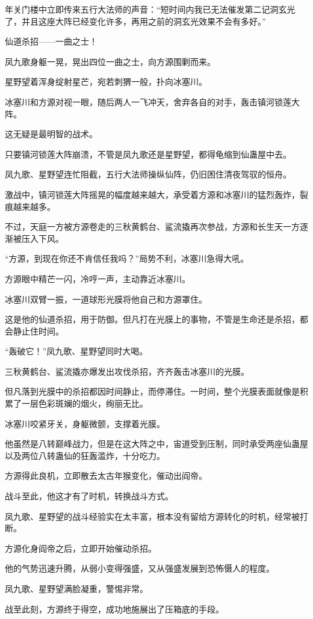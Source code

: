 \begin{this_body}
年关门楼中立即传来五行大法师的声音：“短时间内我已无法催发第二记洞玄光了，并且这座大阵已经变化许多，再用之前的洞玄光效果不会有多好。”

仙道杀招——一曲之士！

凤九歌身躯一晃，晃出四位一曲之士，向方源围剿而来。

星野望着浑身绽射星芒，宛若刺猬一般，扑向冰塞川。

冰塞川和方源对视一眼，随后两人一飞冲天，舍弃各自的对手，轰击镇河锁莲大阵。

这无疑是最明智的战术。

只要镇河锁莲大阵崩溃，不管是凤九歌还是星野望，都得龟缩到仙蛊屋中去。

凤九歌、星野望连忙阻截，五行大法师操纵仙阵，仍旧困住清夜驾驭的恒舟。

激战中，镇河锁莲大阵摇晃的幅度越来越大，承受着方源和冰塞川的猛烈轰炸，裂痕越来越多。

不过，天庭一方被方源卷走的三秋黄鹤台、鲨流撬再次参战，方源和长生天一方逐渐被压入下风。

“方源，到现在你还不肯信任我吗？”局势不利，冰塞川急得大吼。

方源眼中精芒一闪，冷哼一声，主动靠近冰塞川。

冰塞川双臂一振，一道球形光膜将他自己和方源罩住。

这是他的仙道杀招，用于防御。但凡打在光膜上的事物，不管是生命还是杀招，都会静止住时间。

“轰破它！”凤九歌、星野望同时大喝。

三秋黄鹤台、鲨流撬亦爆发出攻伐杀招，齐齐轰击冰塞川的光膜。

但凡落到光膜中的杀招都因时间静止，而停滞住。一时间，整个光膜表面就像是积累了一层色彩斑斓的烟火，绚丽无比。

冰塞川咬紧牙关，身躯微颤，支撑着光膜。

他虽然是八转巅峰战力，但是在这大阵之中，宙道受到压制，同时承受两座仙蛊屋以及两位八转蛊仙的狂轰滥炸，十分吃力。

方源得此良机，立即散去太古年猴变化，催动出阎帝。

战斗至此，他这才有了时机，转换战斗方式。

凤九歌、星野望的战斗经验实在太丰富，根本没有留给方源转化的时机，经常被打断。

方源化身阎帝之后，立即开始催动杀招。

他的气势迅速升腾，从弱小变得强盛，又从强盛发展到恐怖慑人的程度。

凤九歌、星野望满脸凝重，警惕非常。

战至此刻，方源终于得空，成功地施展出了压箱底的手段。


\end{this_body}
